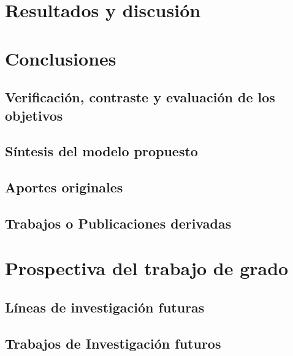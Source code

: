 \chapter{Resultados y discusión}

\chapter{Conclusiones}

\section{Verificación, contraste y evaluación de los objetivos}

\section{Síntesis del modelo propuesto}

\section{Aportes originales}

\section{Trabajos o Publicaciones derivadas}

\chapter{Prospectiva del trabajo de grado}

\section{Líneas de investigación futuras}

\section{Trabajos de Investigación futuros}